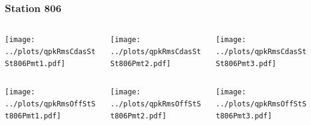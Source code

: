 \documentclass[aspectratio=169]{beamer}
\begin{document}
\begin{frame} 
  \frametitle{Station 806}
  \begin{center}
    \begin{columns}
      \begin{column}{0.33\textwidth}
        \texttt{[image: ../plots/qpkRmsCdasStSt806Pmt1.pdf]}
      \end{column}
      \begin{column}{0.33\textwidth}
        \texttt{[image: ../plots/qpkRmsCdasStSt806Pmt2.pdf]}
      \end{column}
      \begin{column}{0.33\textwidth}
        \texttt{[image: ../plots/qpkRmsCdasStSt806Pmt3.pdf]}
      \end{column}
    \end{columns}
  \end{center}

  \begin{center}
    \begin{columns}
      \begin{column}{0.33\textwidth}
        \texttt{[image: ../plots/qpkRmsOffStSt806Pmt1.pdf]}
      \end{column}
      \begin{column}{0.33\textwidth}
        \texttt{[image: ../plots/qpkRmsOffStSt806Pmt2.pdf]}
      \end{column}
      \begin{column}{0.33\textwidth}
        \texttt{[image: ../plots/qpkRmsOffStSt806Pmt3.pdf]}
      \end{column}
    \end{columns}
  \end{center}
\end{frame}
\end{document}
